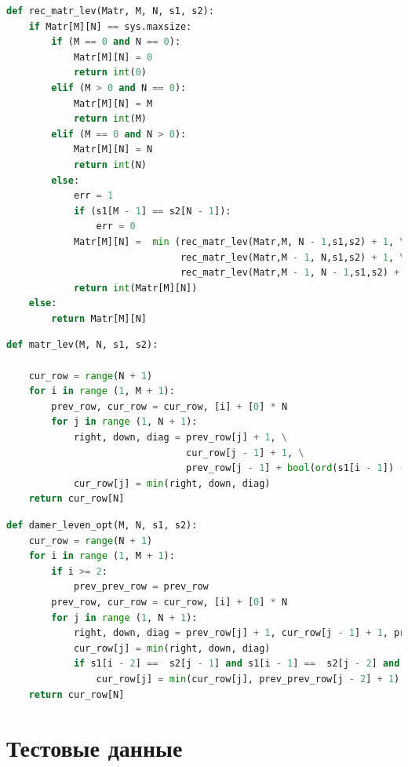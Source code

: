 \documentclass[12pt]{report}
\begin{document}
\begin{lstlisting}[label=some-code,caption=Функция нахождения расстояние Левенштейна рекурсивно с меморизацией,language=Python]
def rec_matr_lev(Matr, M, N, s1, s2):
    if Matr[M][N] == sys.maxsize:
        if (M == 0 and N == 0):
            Matr[M][N] = 0
            return int(0)
        elif (M > 0 and N == 0):
            Matr[M][N] = M
            return int(M)
        elif (M == 0 and N > 0):
            Matr[M][N] = N
            return int(N)
        else:
            err = 1
            if (s1[M - 1] == s2[N - 1]):
                err = 0
            Matr[M][N] =  min (rec_matr_lev(Matr,M, N - 1,s1,s2) + 1, \
                               rec_matr_lev(Matr,M - 1, N,s1,s2) + 1, \
                               rec_matr_lev(Matr,M - 1, N - 1,s1,s2) + err)
            return int(Matr[M][N])
    else:
        return Matr[M][N]
\end{lstlisting}


\begin{lstlisting}[label=some-code,caption=Функция нахождения расстояния Левенштейна итеративно,language=Python]
def matr_lev(M, N, s1, s2):
    
    cur_row = range(N + 1)
    for i in range (1, M + 1):
        prev_row, cur_row = cur_row, [i] + [0] * N
        for j in range (1, N + 1):
            right, down, diag = prev_row[j] + 1, \
                                cur_row[j - 1] + 1, \
                                prev_row[j - 1] + bool(ord(s1[i - 1]) - ord(s2[j - 1]))
            cur_row[j] = min(right, down, diag)
    return cur_row[N]
\end{lstlisting}
\clearpage

\begin{lstlisting}[label=some-code,caption=Функция нахождения расстояния Дамерау-Левенштейна матрично,language=Python]
def damer_leven_opt(M, N, s1, s2):
    cur_row = range(N + 1)
    for i in range (1, M + 1):
        if i >= 2:
            prev_prev_row = prev_row 
        prev_row, cur_row = cur_row, [i] + [0] * N
        for j in range (1, N + 1):
            right, down, diag = prev_row[j] + 1, cur_row[j - 1] + 1, prev_row[j - 1] + bool(ord(s1[i - 1]) - ord(s2[j - 1]))
            cur_row[j] = min(right, down, diag)
            if s1[i - 2] ==  s2[j - 1] and s1[i - 1] ==  s2[j - 2] and i > 1 and j > 1:
                cur_row[j] = min(cur_row[j], prev_prev_row[j - 2] + 1)   
    return cur_row[N]
\end{lstlisting}


\section{Тестовые данные}
\end{document}
